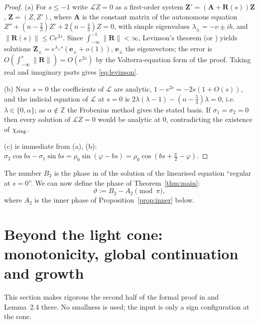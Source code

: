 \documentclass[11pt,a4paper]{amsart}
\theoremstyle{definition}
\theoremstyle{remark}
\newcommand{\Z}{\mathbb{Z}}
\begin{document}
\begin{proof}
(a) For $s\le-1$ write $\mathcal LZ=0$ as a first-order system $\mathbf Z'=(\mathbf A+\mathbf R(s))\mathbf Z$, $\mathbf Z=(Z,Z')$, where $\mathbf A$ is the constant matrix of the autonomous equation $Z''+(n-\frac23)Z'+2(n-\frac43)Z=0$, with simple eigenvalues $\lambda_\pm=-\nu\pm ib$, and $\|\mathbf R(s)\|\le Ce^{2s}$.  Since $\int_{-\infty}^{-1}\|\mathbf R\|<\infty$, Levinson's theorem \cite[Thm.~1.3.1]{Eas89} (or \cite[Ch.~3, Thm.~8.1]{CL55}) yields solutions $\mathbf Z_\pm=e^{\lambda_\pm s}(\mathbf e_\pm+o(1))$, $\mathbf e_\pm$ the eigenvectors; the error is $O(\int_{-\infty}^s\|\mathbf R\|)=O(e^{2s})$ by the Volterra-equation form of the proof.  Taking real and imaginary parts gives \eqref{eq:levinson}.

(b) Near $s=0$ the coefficients of $\mathcal L$ are analytic, $1-e^{2s}=-2s(1+O(s))$, and the indicial equation of $\mathcal L$ at $s=0$ is $2\lambda(\lambda-1)-(n-\frac53)\lambda=0$, i.e.\ $\lambda\in\{0,\alpha\}$; as $\alpha\notin\Z$ the Frobenius method gives the stated basis.  If $\sigma_1=\sigma_2=0$ then every solution of $\mathcal LZ=0$ would be analytic at $0$, contradicting the existence of $\chi_{\rm sing}$.

(c) is immediate from (a), (b): $\sigma_2\cos bs-\sigma_1\sin bs=\rho_0\sin(\varphi-bs)=\rho_0\cos(bs+\frac\pi2-\varphi)$.
\end{proof}

The number $B_2$ is the phase in \cite[(2.31)]{GHL22} of the solution of the linearised equation ``regular at $s=0$''.  We can now define the phase of Theorem~\ref{thm:main}:
\begin{equation}\label{eq:theta}
\vartheta:=B_2-A_2\pmod\pi ,
\end{equation}
where $A_2$ is the inner phase of Proposition~\ref{prop:inner} below.

\section{Beyond the light cone: monotonicity, global continuation and growth}\label{sec:beyond}

This section makes rigorous the second half of the formal proof in \cite[\S2(b)]{GHL22} and Lemma~2.4 there.  No smallness is used; the input is only a sign configuration at the cone.
\end{document}
